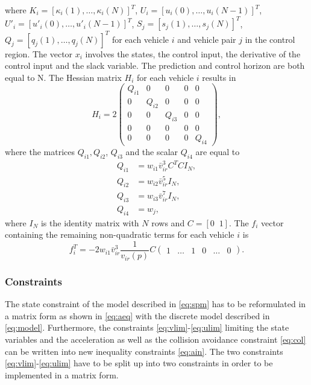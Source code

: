 \documentclass[letterpaper,10pt,conference]{ieeeconf}
\begin{document}
where $K_i=[\kappa_i(1),\ldots,\kappa_i(N)]^T$, $U_i=[u_i(0),\ldots,u_i(N-1)]^T$, $U'_i=[u'_i(0),\ldots,u'_i(N-1)]^T$, $S_j=[s_j(1),\ldots,s_j(N)]^T$, $Q_j=[q_j(1),\ldots,q_j(N)]^T$ for each vehicle $i$ and vehicle pair $j$ in the control region. 
The vector $x_i$ involves the states, the control input, the derivative of the control input and the slack variable. The prediction and control horizon are both equal to N. The Hessian matrix $H_i$ for each vehicle $i$ results in
\begin{equation}\label{eq:hessian}
H_i = 2
\begin{pmatrix}
    Q_{i1} & 0 & 0 & 0 & 0 \\
    0 & Q_{i2} & 0 & 0 & 0 \\
    0 & 0 & Q_{i3} & 0 & 0 \\
    0 & 0 & 0 & 0 & 0  \\
    0 & 0 & 0 & 0 & Q_{i4} 
\end{pmatrix},
\end{equation}
where the matrices $Q_{i1}, Q_{i2}$, $Q_{i3}$ and the scalar $Q_{i4}$ are equal to
\begin{subequations}
\begin{align}
Q_{i1} &= w_{i1}\bar{v}_{ir}^3 C^TC I_N, \\ 
Q_{i2} &=  w_{i2}\bar{v}_{ir}^5I_N ,\\
Q_{i3} &= w_{i3}\bar{v}_{ir}^7I_N, \\
Q_{i4} &= w_j,
\end{align}
\end{subequations}
where $I_N$ is the identity matrix with $N$ rows and $C=[0 \;\; 1]$.
The $f_i$ vector containing the remaining non-quadratic terms for each vehicle $i$ is
\begin{equation}
f_i^T = -2w_{i1}\bar{v}_{ir}^3\frac{1}{v_{ir}(p)}C
\begin{pmatrix}
1 & \hdots & 1 & 0 & \hdots & 0
\end{pmatrix}\label{eq:fvec}.
\end{equation}

\subsubsection{Constraints}
The state constraint of the model described in \eqref{eq:spm} has to be reformulated in a matrix form as shown in \eqref{eq:aeq} with the discrete model described in \eqref{eq:model}. Furthermore, the constraints \eqref{eq:vlim}-\eqref{eq:ulim} limiting the state variables and the acceleration as well as the collision avoidance constraint \eqref{eq:col} can be written into new inequality constraints \eqref{eq:ain}. The two constraints \eqref{eq:vlim}-\eqref{eq:ulim} have to be split up into two constraints in order to be implemented in a matrix form.
\end{document}
